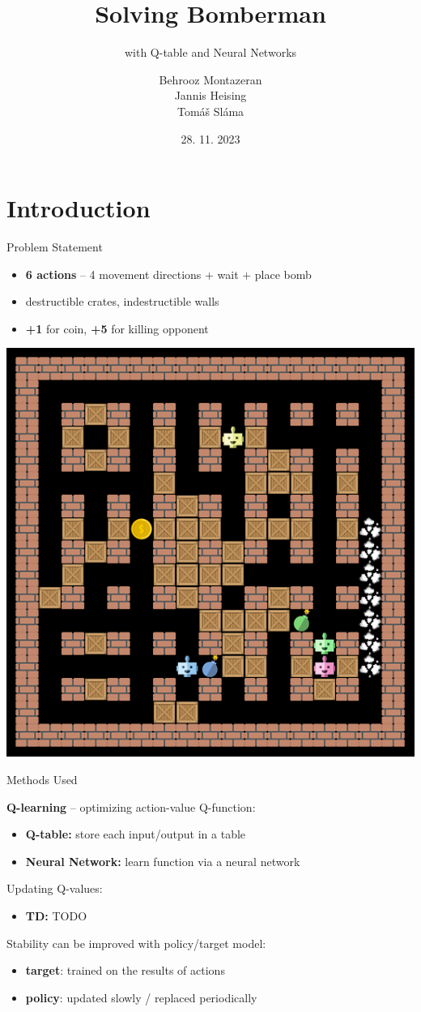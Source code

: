 \documentclass{beamer}
\title{Solving Bomberman}
\subtitle{\large with Q-table and Neural Networks}
\author{\small Behrooz Montazeran\texorpdfstring{\\}{,} Jannis Heising\texorpdfstring{\\}{,} Tomáš Sláma}
\date{28. 11. 2023}
\begin{document}
\begin{frame}
	\maketitle
\end{frame}

\section{Introduction}

\begin{frame}{Problem Statement}
	\pause

	\begin{itemize}
		\item \textbf{6 actions} -- 4 movement directions + wait + place bomb
		\item destructible crates, indestructible walls
		\item \textbf{+1} for coin, \textbf{+5} for killing opponent
	\end{itemize}
	\vfill
	\begin{center}
		\includegraphics[width=0.4\linewidth]{bomberman_example.png}
	\end{center}
\end{frame}

\begin{frame}{Methods Used}
	\pause

	\textbf{Q-learning} -- optimizing action-value Q-function:
	\begin{itemize}
		\item \textbf{Q-table:} store each input/output in a table
		\item \textbf{Neural Network:} learn function via a neural network
	\end{itemize}

	\vspace{1.2em}
	\pause

	Updating Q-values:
	\begin{itemize}
		\item \textbf{TD:} TODO
	\end{itemize}

	\vspace{1.2em}
	\pause

	Stability can be improved with policy/target model:
	\begin{itemize}
		\item \textbf{target}: trained on the results of actions
		\item \textbf{policy}: updated slowly / replaced periodically
	\end{itemize}
\end{frame}
\end{document}
